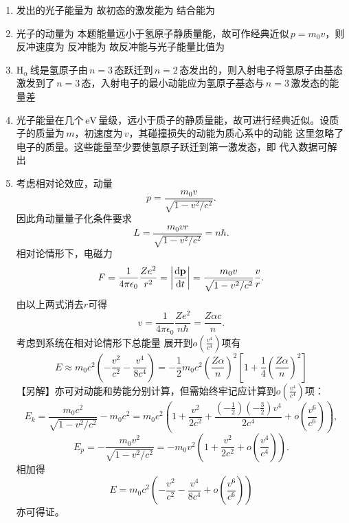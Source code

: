 \begin{enumerate}[label=1.\arabic*, leftmargin=-0.5mm]
\item
发出的光子能量为
故初态的激发能为
结合能为

\item
光子的动量为
本题能量远小于氢原子静质量能，故可作经典近似$\,p=m_0v$，则反冲速度为
反冲能为
故反冲能与光子能量比值为

\item
$\mathrm{H}_\alpha\,$线是氢原子由$\,n=3\,$态跃迁到$\,n=2\,$态发出的，则入射电子将氢原子由基态激发到了$\,n=3\,$态，入射电子的最小动能应为氢原子基态与$\,n=3\,$激发态的能量差

\item
光子能量在几个$\,\mathrm{eV}\,$量级，远小于质子的静质量能，故可进行经典近似。设质子的质量为$\,m$，初速度为$\,v$，其碰撞损失的动能为质心系中的动能
这里忽略了电子的质量。这些能量至少要使氢原子跃迁到第一激发态，即
代入数据可解出

\item 
考虑相对论效应，动量
\[p = \frac{m_0v}{\sqrt{1-v^2/c^2}}.\]
因此角动量量子化条件要求
\[L= \frac{m_0vr}{\sqrt{1-v^2/c^2} }= n\hbar.\]
相对论情形下，电磁力
\[F = \frac{1}{4\pi\epsilon_0}\frac{Ze^2}{r^2} = \abs{\dv{\mathbf{p}}{t}} = \frac{m_0v}{\sqrt{1-v^2/c^2}}\frac{v}{r}.\]
由以上两式消去$r$可得
\[v = \frac{1}{4\pi\epsilon_0}\frac{Ze^2}{n\hbar} = \frac{Z\alpha c}{n}.\]
考虑到系统在相对论情形下总能量 
展开到$o(\frac{v^4}{c^4})$项有
\[E \approx m_0c^2\left(-\frac{v^2}{c^2}-\frac{v^4}{8c^4}\right)
= -\frac{1}{2}m_0c^2\left(\frac{Z\alpha}{n}\right)^2\left[1+\frac{1}{4}\left(\frac{Z\alpha}{n}\right)^2\right]\]
【另解】亦可对动能和势能分别计算，但需始终牢记应计算到$o(\frac{v^4}{c^4})$项：
\[E_k = \frac{m_0 c^2}{\sqrt{1-v^2/c^2}}-m_0c^2 
=m_0c^2\left(1+\frac{v^2}{2c^2}+\frac{(-\frac{1}{2})(-\frac{3}{2})v^4}{2c^4}+o(\frac{v^6}{c^6})\right),\]
\[E_p = -\frac{m_0v^2}{\sqrt{1-v^2/c^2}} = -m_0v^2\left(1+\frac{v^2}{2c^2}+o(\frac{v^4}{c^4})\right).\]
相加得
\[E = m_0c^2\left(-\frac{v^2}{c^2}-\frac{v^4}{8c^4}+o(\frac{v^6}{c^6})\right)\]
亦可得证。


\end{enumerate}
